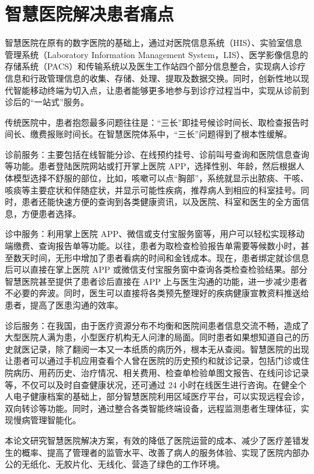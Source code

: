 \documentclass[doctor,secret]{thuthesis}
\begin{document}
\section{智慧医院解决患者痛点}
\label{sec:orgc5cfc25}
智慧医院在原有的数字医院的基础上，通过对医院信息系统（HIS）、实验室信息管理系统（Laboratory Information Management System，LIS）、医学影像信息的存储系统（PACS）和传输系统以及医生工作站四个部分信息整合，实现病人诊疗信息和行政管理信息的收集、存储、处理、提取及数据交换。同时，创新性地以现代智能移动终端为切入点，让患者能够更多地参与到诊疗过程当中，实现从诊前到诊后的“一站式”服务。

传统医院中，患者抱怨最多问题往往是：“三长”即挂号候诊时间长、取检查报告时间长、缴费报账时间长。在智慧医院体系中，“三长”问题得到了根本性缓解。

诊前服务：主要包括在线智能分诊、在线预约挂号、诊前叫号查询和医院信息查询等功能。患者登陆医院网站或打开掌上医院 APP，选择性别、年龄，然后根据人体模型选择不舒服的部位，比如，咳嗽可以点“胸部”，系统就显示出脓痰、干咳、咳痰等主要症状和伴随症状，并显示可能性疾病，推荐病人到相应的科室挂号。同时，患者还能快速方便的查询到各类健康资讯，以及医院、科室和医生的全方面信息，方便患者选择。

诊中服务：利用掌上医院 APP、微信或支付宝服务窗等，用户可以轻松实现移动端缴费、查询报告单等功能。以往，患者为取检查检验报告单需要等候数小时，甚至数天时间，无形中增加了患者看病的时间和金钱成本。现在，患者绑定就诊信息后可以直接在掌上医院 APP 或微信支付宝服务窗中查询各类检查检验结果。部分智慧医院甚至提供了患者诊后直接在 APP 上与医生沟通的功能，进一步减少患者不必要的奔波。同时，医生可以直接将各类预先整理好的疾病健康宣教资料推送给患者，提高了医患沟通的效率。

诊后服务：在我国，由于医疗资源分布不均衡和医院间患者信息交流不畅，造成了大型医院人满为患，小型医疗机构无人问津的局面。同时患者如果想知道自己的历史就医记录，除了翻阅一本又一本纸质的病历外，根本无从查阅。智慧医院的出现让患者可以通过手机应用查看个人曾在医院的历史预约和就诊记录，包括门诊或住院病历、用药历史、治疗情况、相关费用、检查单检验单图文报告、在线问诊记录等，不仅可以及时自查健康状况，还可通过 24 小时在线医生进行咨询。在健全个人电子健康档案的基础上，部分智慧医院利用区域医疗平台，可以实现远程会诊，双向转诊等功能。同时，通过整合各类智能终端设备，远程监测患者生理体征，实现慢病管理智能化。

本论文研究智慧医院解决方案，有效的降低了医院运营的成本、减少了医疗差错发生的概率、提高了管理者的监管水平、改善了病人的服务体验、实现了医院内部办公的无纸化、无胶片化、无线化、营造了绿色的工作环境。
\end{document}
